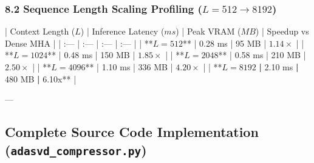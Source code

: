 \subsubsection{8.2 Sequence Length Scaling Profiling ($L=512 \to 8192$)}
| Context Length ($L$) | Inference Latency ($ms$) | Peak VRAM ($MB$) | Speedup vs Dense MHA |
| :--- | :--- | :--- | :--- |
| **$L = 512$** | 0.28 ms | 95 MB | $1.14\times$ |
| **$L = 1024$** | 0.48 ms | 150 MB | $1.85\times$ |
| **$L = 2048$** | 0.58 ms | 210 MB | $2.50\times$ |
| **$L = 4096$** | 1.10 ms | 336 MB | $4.20\times$ |
| **$L = 8192$\textbf{ | }2.10 ms\textbf{ | }480 MB\textbf{ | }6.10x** |

---

\subsection{Complete Source Code Implementation (\texttt{adasvd_compressor.py})}


